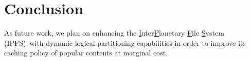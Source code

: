 
\section{Conclusion}
\label{sec:conclusion}

As future work, we plan on enhancing the
\underline{I}nter\underline{P}lanetary \underline{F}ile
\underline{S}ystem (IPFS)~\REF with dynamic logical partitioning
capabilities in order to improve its caching policy of popular
contents at marginal cost.

